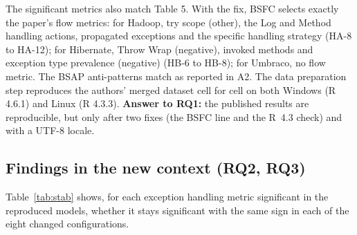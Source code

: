 \documentclass[conference]{IEEEtran}
\begin{document}
The significant metrics also match Table 5. With the fix, BSFC selects exactly the paper's flow metrics: for Hadoop, try scope (other), the Log and Method handling actions, propagated exceptions and the specific handling strategy (HA-8 to HA-12); for Hibernate, Throw Wrap (negative), invoked methods and exception type prevalence (negative) (HB-6 to HB-8); for Umbraco, no flow metric. The BSAP anti-patterns match as reported in A2. The data preparation step reproduces the authors' merged dataset cell for cell on both Windows (R 4.6.1) and Linux (R 4.3.3). \textbf{Answer to RQ1:} the published results are reproducible, but only after two fixes (the BSFC line and the R~4.3 check) and with a UTF-8 locale.

\subsection{Findings in the new context (RQ2, RQ3)}\label{sec:sens}
Table~\ref{tab:stab} shows, for each exception handling metric significant in the reproduced models, whether it stays significant with the same sign in each of the eight changed configurations.
\end{document}
